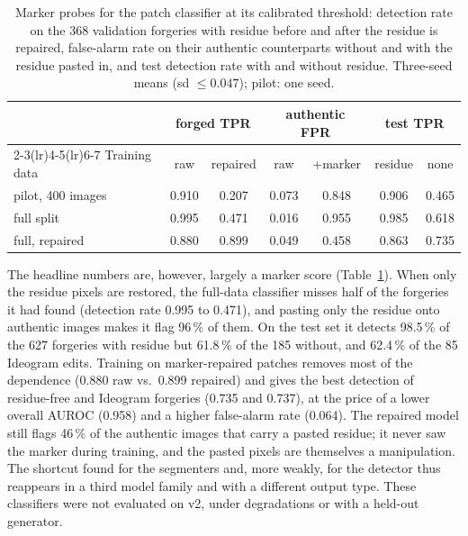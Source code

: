 \begin{table}[t]
\caption{Marker probes for the patch classifier at its calibrated threshold: detection rate on the 368 validation forgeries with residue before and after the residue is repaired, false-alarm rate on their authentic counterparts without and with the residue pasted in, and test detection rate with and without residue. Three-seed means (sd $\le0.047$); pilot: one seed.}
\label{tab:clsprobe}
\centering\footnotesize
\setlength{\tabcolsep}{2.6pt}
\begin{tabular}{@{}lcccccc@{}}
\toprule
 & \multicolumn{2}{c}{forged TPR} & \multicolumn{2}{c}{authentic FPR} & \multicolumn{2}{c}{test TPR} \\
\cmidrule(lr){2-3}\cmidrule(lr){4-5}\cmidrule(lr){6-7}
Training data & raw & repaired & raw & +marker & residue & none \\
\midrule
pilot, 400 images & 0.910 & 0.207 & 0.073 & 0.848 & 0.906 & 0.465 \\
full split & 0.995 & 0.471 & 0.016 & 0.955 & 0.985 & 0.618 \\
full, repaired & 0.880 & 0.899 & 0.049 & 0.458 & 0.863 & 0.735 \\
\bottomrule
\end{tabular}
\end{table}

The headline numbers are, however, largely a marker score (Table~\ref{tab:clsprobe}). When only the residue pixels are restored, the full-data classifier misses half of the forgeries it had found (detection rate 0.995 to 0.471), and pasting only the residue onto authentic images makes it flag 96\,\% of them. On the test set it detects 98.5\,\% of the 627 forgeries with residue but 61.8\,\% of the 185 without, and 62.4\,\% of the 85 Ideogram edits. Training on marker-repaired patches removes most of the dependence (0.880 raw vs.\ 0.899 repaired) and gives the best detection of residue-free and Ideogram forgeries (0.735 and 0.737), at the price of a lower overall AUROC (0.958) and a higher false-alarm rate (0.064). The repaired model still flags 46\,\% of the authentic images that carry a pasted residue; it never saw the marker during training, and the pasted pixels are themselves a manipulation. The shortcut found for the segmenters and, more weakly, for the detector thus reappears in a third model family and with a different output type. These classifiers were not evaluated on v2, under degradations or with a held-out generator.

